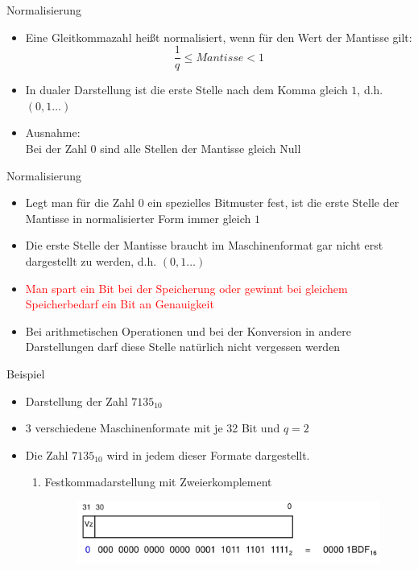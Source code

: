 \documentclass[12pt%
,aspectratio=169%
]{beamer}
\begin{document}
\begin{frame}{Normalisierung}
\begin{itemize}
	\item Eine Gleitkommazahl heißt normalisiert, wenn für den Wert der Mantisse gilt:
	$$
		\frac{1}{q} \leq Mantisse < 1
	$$
	\item In dualer Darstellung ist die erste Stelle nach dem Komma gleich $1$, d.h. $(0,1 \ldots )$
	\item Ausnahme:\\
	Bei der Zahl 0 sind alle Stellen der Mantisse gleich Null
\end{itemize}
\end{frame}


\begin{frame}{Normalisierung}
\begin{itemize}
	\item Legt man für die Zahl $0$ ein spezielles Bitmuster fest, ist die erste Stelle der Mantisse in normalisierter Form immer gleich $1$
	\item Die erste Stelle der Mantisse braucht im Maschinenformat gar nicht erst dargestellt zu werden, d.h. $(0,1 \ldots)$
	\item \textcolor{red}{Man spart ein Bit bei der Speicherung oder gewinnt bei gleichem Speicherbedarf ein Bit an Genauigkeit}
	\item Bei arithmetischen Operationen und bei der Konversion in andere Darstellungen darf diese Stelle natürlich nicht vergessen werden
\end{itemize}
\end{frame}

\begin{frame}{Beispiel}
\begin{itemize}
	\item Darstellung der Zahl $7135_{10}$
	\item 3 verschiedene Maschinenformate mit je 32 Bit und $q = 2$
	\item Die Zahl $7135_{10}$ wird in jedem dieser Formate dargestellt.
	\begin{enumerate}
		\item Festkommadarstellung mit Zweierkomplement
		\begin{figure}
			\includegraphics[scale=0.3]{pictures/festkomma}
		\end{figure}
	\end{enumerate}
\end{itemize}
\end{frame}
\end{document}
